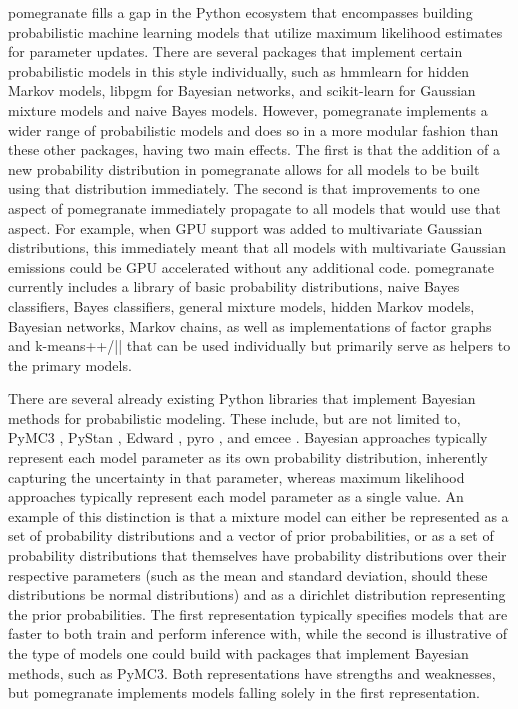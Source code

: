 \documentclass{article}
\begin{document}
pomegranate fills a gap in the Python ecosystem that encompasses building probabilistic machine learning models that utilize maximum likelihood estimates for parameter updates. There are several packages that implement certain probabilistic models in this style individually, such as hmmlearn for hidden Markov models, libpgm for Bayesian networks, and scikit-learn for Gaussian mixture models and naive Bayes models. However, pomegranate implements a wider range of probabilistic models and does so in a more modular fashion than these other packages, having two main effects. The first is that the addition of a new probability distribution in pomegranate allows for all models to be built using that distribution immediately. The second is that improvements to one aspect of pomegranate immediately propagate to all models that would use that aspect. For example, when GPU support was added to multivariate Gaussian distributions, this immediately meant that all models with multivariate Gaussian emissions could be GPU accelerated without any additional code. pomegranate currently includes a library of basic probability distributions, naive Bayes classifiers, Bayes classifiers, general mixture models, hidden Markov models, Bayesian networks, Markov chains, as well as implementations of factor graphs and k-means++/|| that can be used individually but primarily serve as helpers to the primary models.

There are several already existing Python libraries that implement Bayesian methods for probabilistic modeling. These include, but are not limited to, PyMC3 \citep{pymc3}, PyStan \citep{pystan}, Edward \citep{edward}, pyro \citep{pyro}, and emcee \citep{emcee}. Bayesian approaches typically represent each model parameter as its own probability distribution, inherently capturing the uncertainty in that parameter, whereas maximum likelihood approaches typically represent each model parameter as a single value. An example of this distinction is that a mixture model can either be represented as a set of probability distributions and a vector of prior probabilities, or as a set of probability distributions that themselves have probability distributions over their respective parameters (such as the mean and standard deviation, should these distributions be normal distributions) and as a dirichlet distribution representing the prior probabilities. The first representation typically specifies models that are faster to both train and perform inference with, while the second is illustrative of the type of models one could build with packages that implement Bayesian methods, such as PyMC3. Both representations have strengths and weaknesses, but pomegranate implements models falling solely in the first representation.
\end{document}
